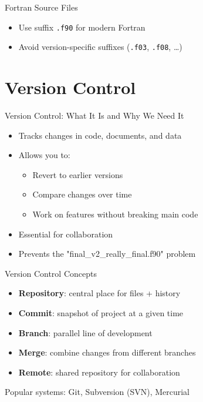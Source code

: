 \begin{frame}{Fortran Source Files}
	\begin{itemize}
		\item Use suffix \texttt{.f90} for modern Fortran
		\item Avoid version-specific suffixes (\texttt{.f03}, \texttt{.f08}, …)
	\end{itemize}
\end{frame}


\section{Version Control}
\begin{frame}{Version Control: What It Is and Why We Need It}
	\begin{itemize}
		\item Tracks changes in code, documents, and data
		\item Allows you to:
		\begin{itemize}
			\item Revert to earlier versions
			\item Compare changes over time
			\item Work on features without breaking main code
		\end{itemize}
		\item Essential for collaboration
		\item Prevents the "final\_v2\_really\_final.f90" problem
	\end{itemize}
\end{frame}

\begin{frame}{Version Control Concepts}
	\begin{itemize}
		\item \textbf{Repository}: central place for files + history
		\item \textbf{Commit}: snapshot of project at a given time
		\item \textbf{Branch}: parallel line of development
		\item \textbf{Merge}: combine changes from different branches
		\item \textbf{Remote}: shared repository for collaboration
	\end{itemize}
	\vspace{0.5em}
	Popular systems: Git, Subversion (SVN), Mercurial  
\end{frame}


